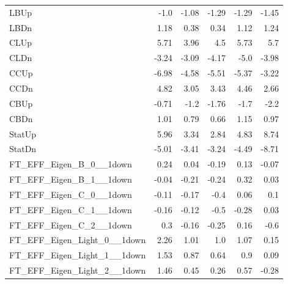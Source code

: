 \begin{table}[htbp]
{\begin{tabular}{lrrrrr}
LBUp                                                  & -1.0              & -1.08  & -1.29 & -1.29 & -1.45  \\
LBDn                                                  & 1.18              & 0.38   & 0.34  & 1.12  & 1.24   \\
CLUp                                                  & 5.71              & 3.96   & 4.5   & 5.73  & 5.7    \\
CLDn                                                  & -3.24             & -3.09  & -4.17 & -5.0  & -3.98  \\
CCUp                                                  & -6.98             & -4.58  & -5.51 & -5.37 & -3.22  \\
CCDn                                                  & 4.82              & 3.05   & 3.43  & 4.46  & 2.66   \\
CBUp                                                  & -0.71             & -1.2   & -1.76 & -1.7  & -2.2   \\
CBDn                                                  & 1.01              & 0.79   & 0.66  & 1.15  & 0.97   \\
StatUp                                                & 5.96              & 3.34   & 2.84  & 4.83  & 8.74   \\
StatDn                                                & -5.01             & -3.41  & -3.24 & -4.49 & -8.71  \\
FT\_EFF\_Eigen\_B\_0\_\_1down                         & 0.24              & 0.04   & -0.19 & 0.13  & -0.07  \\
FT\_EFF\_Eigen\_B\_1\_\_1down                         & -0.04             & -0.21  & -0.24 & 0.32  & 0.03   \\
FT\_EFF\_Eigen\_C\_0\_\_1down                         & -0.11             & -0.17  & -0.4  & 0.06  & 0.1    \\
FT\_EFF\_Eigen\_C\_1\_\_1down                         & -0.16             & -0.12  & -0.5  & -0.28 & 0.03   \\
FT\_EFF\_Eigen\_C\_2\_\_1down                         & 0.3               & -0.16  & -0.25 & 0.16  & -0.6   \\
FT\_EFF\_Eigen\_Light\_0\_\_1down                     & 2.26              & 1.01   & 1.0   & 1.07  & 0.15   \\
FT\_EFF\_Eigen\_Light\_1\_\_1down                     & 1.53              & 0.87   & 0.64  & 0.9   & 0.09   \\
FT\_EFF\_Eigen\_Light\_2\_\_1down                     & 1.46              & 0.45   & 0.26  & 0.57  & -0.28  \\

\end{tabular}}
\end{table}
